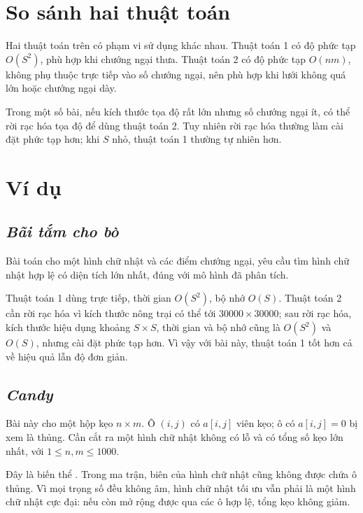 \documentclass[11pt]{article}
\begin{document}
\section{So sánh hai thuật toán}

Hai thuật toán trên có phạm vi sử dụng khác nhau. Thuật toán 1 có độ phức tạp
\(O(S^2)\), phù hợp khi chướng ngại thưa. Thuật toán 2 có độ phức tạp
\(O(nm)\), không phụ thuộc trực tiếp vào số chướng ngại, nên phù hợp khi lưới
không quá lớn hoặc chướng ngại dày.

Trong một số bài, nếu kích thước tọa độ rất lớn nhưng số chướng ngại ít, có
thể rời rạc hóa tọa độ để dùng thuật toán 2. Tuy nhiên rời rạc hóa thường
làm cài đặt phức tạp hơn; khi \(S\) nhỏ, thuật toán 1 thường tự nhiên hơn.

\section{Ví dụ}

\subsection{\textit{Bãi tắm cho bò}}

Bài toán cho một hình chữ nhật và các điểm chướng ngại, yêu cầu tìm hình chữ
nhật hợp lệ có diện tích lớn nhất, đúng với mô hình đã phân tích.

Thuật toán 1 dùng trực tiếp, thời gian \(O(S^2)\), bộ nhớ \(O(S)\). Thuật toán
2 cần rời rạc hóa vì kích thước nông trại có thể tới \(30000\times 30000\);
sau rời rạc hóa, kích thước hiệu dụng khoảng \(S\times S\), thời gian và bộ
nhớ cũng là \(O(S^2)\) và \(O(S)\), nhưng cài đặt phức tạp hơn. Vì vậy với
bài này, thuật toán 1 tốt hơn cả về hiệu quả lẫn độ đơn giản.

\subsection{\textit{Candy}}

Bài này cho một hộp kẹo \(n\times m\). Ô \((i,j)\) có \(a[i,j]\) viên kẹo;
ô có \(a[i,j]=0\) bị xem là thủng. Cần cắt ra một hình chữ nhật không có lỗ
và có tổng số kẹo lớn nhất, với \(1\le n,m\le 1000\).

Đây là biến thể . Trong
ma trận, biên của hình chữ nhật cũng không được chứa ô thủng. Vì mọi trọng số
đều không âm, hình chữ nhật tối ưu vẫn phải là một hình chữ nhật cực đại:
nếu còn mở rộng được qua các ô hợp lệ, tổng kẹo không giảm.
\end{document}
